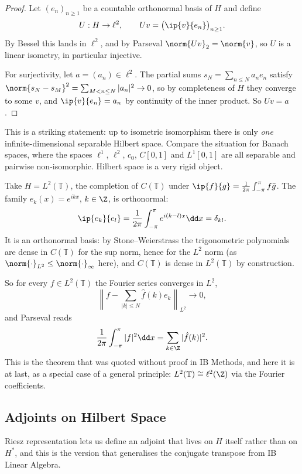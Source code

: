 \begin{proof}
	Let $(e_n)_{n\geq1}$ be a countable orthonormal basis of $H$ and define
	$$U : H \to \ell^2, \qquad Uv = \big(\ip{v}{e_n}\big)_{n\geq1}.$$
	By Bessel this lands in $\ell^2$, and by Parseval $\norm{Uv}_2 = \norm{v}$, so $U$ is a linear isometry, in particular injective.

	For surjectivity, let $a = (a_n)\in\ell^2$. The partial sums $s_N = \sum_{n\leq N}a_ne_n$ satisfy $\norm{s_N-s_M}^2 = \sum_{M<n\leq N}|a_n|^2 \to 0$, so by completeness of $H$ they converge to some $v$, and $\ip{v}{e_n} = a_n$ by continuity of the inner product. So $Uv = a$.
\end{proof}

This is a striking statement: up to isometric isomorphism there is only \emph{one} infinite-dimensional separable Hilbert space. Compare the situation for Banach spaces, where the spaces $\ell^1$, $\ell^2$, $c_0$, $C[0,1]$ and $L^1[0,1]$ are all separable and pairwise non-isomorphic. Hilbert space is a very rigid object.

\begin{example}
	Take $H = L^2(\mathbb{T})$, the completion of $C(\mathbb{T})$ under $\ip{f}{g}=\frac{1}{2\pi}\int_{-\pi}^\pi f\bar g$. The family $e_k(x) = e^{ikx}$, $k \in \Z$, is orthonormal:
	$$\ip{e_k}{e_l} = \frac{1}{2\pi}\int_{-\pi}^{\pi}e^{i(k-l)x}\dd x = \delta_{kl}.$$
	It is an orthonormal basis: by Stone--Weierstrass the trigonometric polynomials are dense in $C(\mathbb{T})$ for the sup norm, hence for the $L^2$ norm (as $\norm{\cdot}_{L^2}\leq\norm{\cdot}_\infty$ here), and $C(\mathbb{T})$ is dense in $L^2(\mathbb{T})$ by construction.

	So for every $f \in L^2(\mathbb{T})$ the Fourier series converges in $L^2$,
	$$\left\| f - \sum_{|k|\leq N} \hat f(k)e_k \right\|_{L^2} \longrightarrow 0,$$
	and Parseval reads
	$$\frac{1}{2\pi}\int_{-\pi}^\pi |f|^2 \dd x = \sum_{k \in \Z}|\hat f(k)|^2.$$
	This is the theorem that was quoted without proof in IB Methods, and here it is at last, as a special case of a general principle: $L^2(\mathbb{T}) \cong \ell^2(\Z)$ via the Fourier coefficients.
\end{example}

\subsection{Adjoints on Hilbert Space}

Riesz representation lets us define an adjoint that lives on $H$ itself rather than on $H^*$, and this is the version that generalises the conjugate transpose from IB Linear Algebra.

